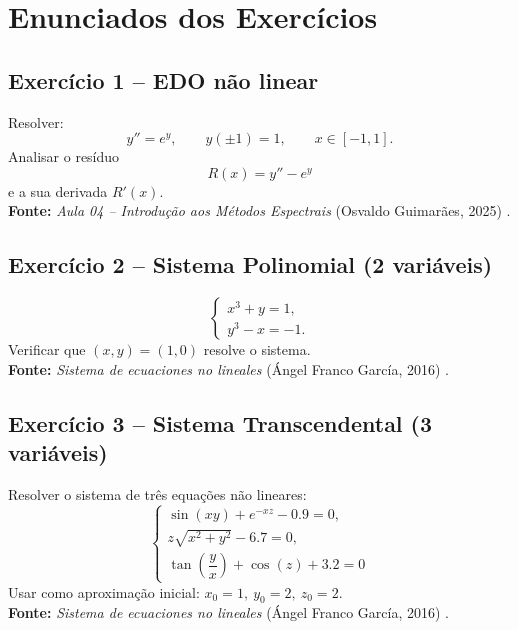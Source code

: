 \documentclass[12pt,a4paper]{article}
\begin{document}
\section{Enunciados dos Exercícios}

\subsection{Exercício 1 -- EDO não linear}
Resolver:
\begin{equation}
    y'' = e^{y}, \qquad y(\pm 1) = 1, \qquad x \in [-1, 1].
\end{equation}
Analisar o resíduo
\begin{equation}
    R(x) = y'' - e^{y}
\end{equation}
e a sua derivada \(R'(x)\).\\
\textbf{Fonte:} \textit{Aula 04 -- Introdução aos Métodos Espectrais} (Osvaldo Guimarães, 2025) \cite{guimaraes2025}.

\subsection{Exercício 2 -- Sistema Polinomial (2 variáveis)}
\begin{equation}
\begin{cases}
x^3 + y = 1,\\
y^3 - x = -1.
\end{cases}
\end{equation}
Verificar que \((x,y) = (1,0)\) resolve o sistema.\\
\textbf{Fonte:} \textit{Sistema de ecuaciones no lineales} (Ángel Franco García, 2016) \cite{garcia2016}.

\subsection{Exercício 3 -- Sistema Transcendental (3 variáveis)}
Resolver o sistema de três equações não lineares:
\begin{equation}
\begin{cases}
\sin(xy) + e^{-xz} - 0.9 = 0, \\
z\sqrt{x^2 + y^2} - 6.7 = 0, \\
\tan\!\left(\dfrac{y}{x}\right) + \cos(z) + 3.2 = 0
\end{cases}
\end{equation}
Usar como aproximação inicial: \(x_0=1,\ y_0=2,\ z_0=2\).\\
\textbf{Fonte:} \textit{Sistema de ecuaciones no lineales} (Ángel Franco García, 2016) \cite{garcia2016}.
\end{document}
